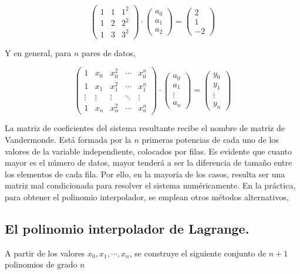 \begin{equation*}
\begin{pmatrix}
1&1&1^2\\
1&2&2^2\\
1&3&3^2
\end{pmatrix}\cdot \begin{pmatrix}
a_0\\
a_1\\
a_2
\end{pmatrix}=\begin{pmatrix}
2\\
1\\
-2
\end{pmatrix}
\end{equation*}
\begin{paracol}{2}
Y en general, para $n$ pares de datos,
\end{paracol}
\begin{equation*}
\begin{pmatrix}
1&x_0&x_0^2&\cdots &x_0^n\\
1&x_1&x_1^2&\cdots &x_1^n\\
\vdots&\vdots&\vdots&\ddots&\vdots\\
1&x_n&x_n^2&\cdots &x_n^n
\end{pmatrix}\cdot \begin{pmatrix}
a_0\\
a_1\\
\vdots\\
a_n

\end{pmatrix}=\begin{pmatrix}
y_0\\
y_1\\
\vdots\\
y_n
\end{pmatrix}
\end{equation*}
\begin{paracol}{2}
La matriz de coeficientes del sistema resultante recibe el nombre de matriz de Vandermonde. Está formada por la $n$ primeras potencias de cada uno de los valores de la variable independiente, colocados por filas. Es evidente que cuanto mayor es el número de datos, mayor tenderá a ser la diferencia de tamaño entre los elementos de cada fila. Por ello, en la mayoría de los casos, resulta ser una matriz mal condicionada para resolver el sistema numéricamente. En la práctica, para obtener el polinomio interpolador, se emplean otros métodos alternativos,

\subsection{El polinomio interpolador de Lagrange.} \label{sec:lagranje} 

A partir de los valores $x_0, x_1,\cdots, x_n$, se construye el siguiente conjunto de $n+1$ polinomios de grado $n$
\end{paracol}
